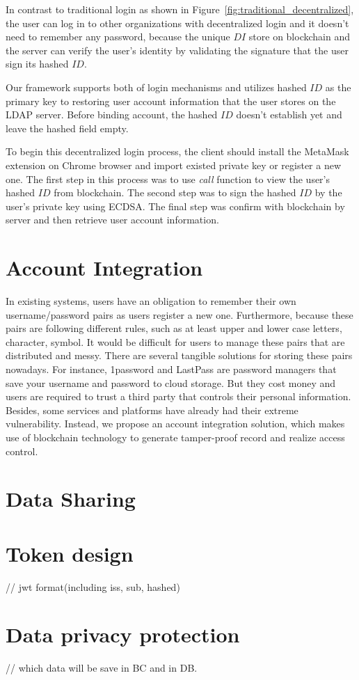 In contrast to traditional login as shown in Figure~\ref{fig:traditional_decentralized}, the user can log in to other organizations with decentralized login and it doesn't need to remember any password, because the unique \(DI\) store on blockchain and the server can verify the user's identity by validating the signature that the user sign its hashed \(ID\).\par
Our framework supports both of login mechanisms and utilizes hashed \(ID\) as the primary key to restoring user account information that the user stores on the LDAP server. Before binding account, the hashed \(ID\) doesn't establish yet and leave the hashed field empty.\par 
To begin this decentralized login process, the client should install the MetaMask extension on Chrome browser and import existed private key or register a new one. The first step in this process was to use \textit{call} function to view the user's hashed \(ID\) from blockchain. The second step was to sign the hashed \(ID\) by the user's private key using ECDSA. The final step was confirm with blockchain by server and then retrieve user account information.

\newpage
\section{Account Integration}
In existing systems, users have an obligation to remember their own username/password pairs as users register a new one. Furthermore, because these pairs are following different rules, such as at least upper and lower case letters, character, symbol. It would be difficult for users to manage these pairs that are distributed and messy. There are several tangible solutions for storing these pairs nowadays. For instance, 1password and LastPass are password managers that save your username and password to cloud storage. But they cost money and users are required to trust a third party that controls their personal information. Besides, some services and platforms have already had their extreme vulnerability. Instead, we propose an account integration solution, which makes use of blockchain technology to generate tamper-proof record and realize access control.

\section{Data Sharing}
\section{Token design}
// jwt format(including iss, sub, hashed)
\section{Data privacy protection}
// which data will be save in BC and in DB.
